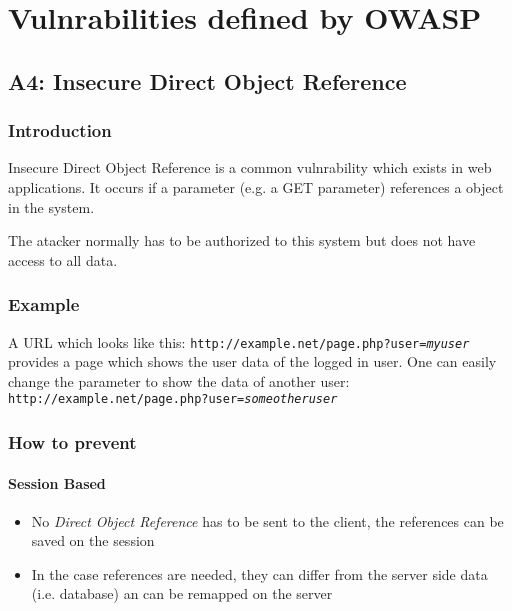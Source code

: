 \documentclass[11pt,twoside,a4paper]{article}
\title{\titleText}
\author{\authorText}
\date{\dateText}
\begin{document}
\maketitle
\tableofcontents

\section{Vulnrabilities defined by OWASP}
\subsection{A4: Insecure Direct Object Reference}

\subsubsection{Introduction}
Insecure Direct Object Reference is a common vulnrability which exists
in web applications. It occurs if a parameter (e.g. a GET parameter)
references a object in the system. 

The atacker normally has to be authorized to this system but does not
have access to all data.

\subsubsection{Example}

A URL which looks like this:
\texttt{http://example.net/page.php?user=\textit{myuser}} provides a
page which shows the user data of the logged in user. One can easily
change the parameter to show the data of another user:
\texttt{http://example.net/page.php?user=\textit{someotheruser}}

\subsubsection{How to prevent}

\paragraph{Session Based}

\begin{itemize}
\item No \textit{Direct Object Reference} has to be sent to the client, the references can be saved on the session
\item In the case references are needed, they can differ from the server side data (i.e. database) an can be remapped on the server
\end{itemize}
\end{document}
